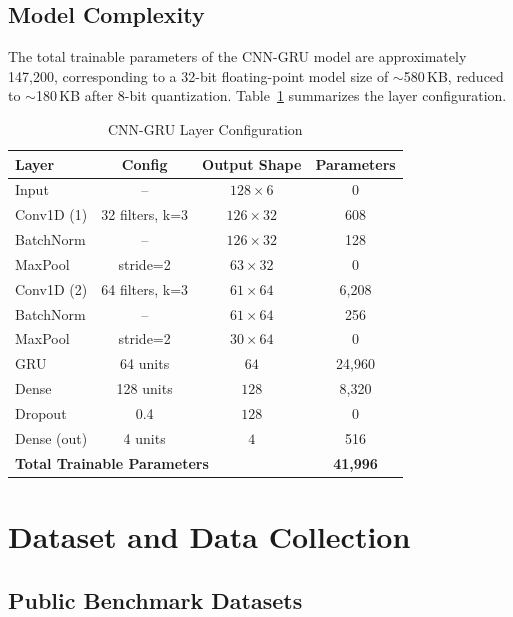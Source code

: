 \documentclass[conference]{IEEEtran}
\begin{document}
\subsection{Model Complexity}

The total trainable parameters of the CNN-GRU model are approximately 147,200, corresponding to a 32-bit floating-point model size of $\sim$580\,KB, reduced to $\sim$180\,KB after 8-bit quantization. Table~\ref{tab:model_arch} summarizes the layer configuration.

\begin{table}[!t]
\centering
\caption{CNN-GRU Layer Configuration}
\label{tab:model_arch}
\renewcommand{\arraystretch}{1.1}
\begin{tabular}{|l|c|c|c|}
\hline
\textbf{Layer} & \textbf{Config} & \textbf{Output Shape} & \textbf{Parameters} \\
\hline
Input & -- & $128 \times 6$ & 0 \\
Conv1D (1) & 32 filters, k=3 & $126 \times 32$ & 608 \\
BatchNorm & -- & $126 \times 32$ & 128 \\
MaxPool & stride=2 & $63 \times 32$ & 0 \\
Conv1D (2) & 64 filters, k=3 & $61 \times 64$ & 6,208 \\
BatchNorm & -- & $61 \times 64$ & 256 \\
MaxPool & stride=2 & $30 \times 64$ & 0 \\
GRU & 64 units & $64$ & 24,960 \\
Dense & 128 units & $128$ & 8,320 \\
Dropout & 0.4 & $128$ & 0 \\
Dense (out) & 4 units & $4$ & 516 \\
\hline
\multicolumn{3}{|l|}{\textbf{Total Trainable Parameters}} & \textbf{41,996} \\
\hline
\end{tabular}
\end{table}

\section{Dataset and Data Collection}

\subsection{Public Benchmark Datasets}
\end{document}
